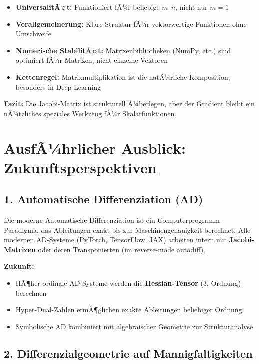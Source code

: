 ﻿\documentclass[a4paper,12pt]{article}
\theoremstyle{definition}
\begin{document}
\begin{itemize}
	\item \textbf{UniversalitÃ¤t:} Funktioniert fÃ¼r beliebige $m, n$, nicht nur $m = 1$
	\item \textbf{Verallgemeinerung:} Klare Struktur fÃ¼r vektorwertige Funktionen ohne Umschweife
	\item \textbf{Numerische StabilitÃ¤t:} Matrizenbibliotheken (NumPy, etc.) sind optimiert fÃ¼r Matrizen, nicht einzelne Vektoren
	\item \textbf{Kettenregel:} Matrixmultiplikation ist die natÃ¼rliche Komposition, besonders in Deep Learning
\end{itemize}

\textbf{Fazit:} Die Jacobi-Matrix ist strukturell Ã¼berlegen, aber der Gradient bleibt ein nÃ¼tzliches speziales Werkzeug fÃ¼r Skalarfunktionen.

\newpage

\section{AusfÃ¼hrlicher Ausblick: Zukunftsperspektiven}

\subsection{1. Automatische Differenziation (AD)}

Die moderne Automatische Differenziation ist ein Computerprogramm-Paradigma, das Ableitungen exakt bis zur Maschinengenauigkeit berechnet. Alle modernen AD-Systeme (PyTorch, TensorFlow, JAX) arbeiten intern mit \textbf{Jacobi-Matrizen} oder deren Transponierten (im reverse-mode autodiff).

\textbf{Zukunft:}
\begin{itemize}
	\item HÃ¶her-ordinale AD-Systeme werden die \textbf{Hessian-Tensor} (3. Ordnung) berechnen
	\item Hyper-Dual-Zahlen ermÃ¶glichen exakte Ableitungen beliebiger Ordnung
	\item Symbolische AD kombiniert mit algebraischer Geometrie zur Strukturanalyse
\end{itemize}

\subsection{2. Differenzialgeometrie auf Mannigfaltigkeiten}
\end{document}
